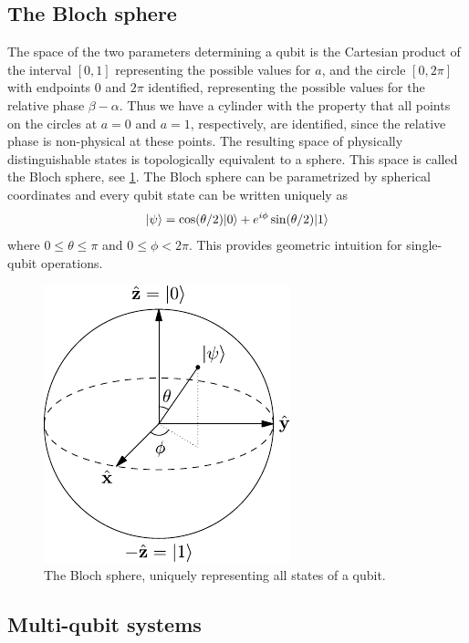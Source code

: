 \documentclass[a4paper,10pt,oneside]{book}
\theoremstyle{plain}
\theoremstyle{definition}
\theoremstyle{remark}
\DeclarePairedDelimiter\ket{\lvert}{\rangle}
\begin{document}
\subsection{The Bloch sphere}

The space of the two parameters determining a qubit is the Cartesian product of the interval $[0,1]$ representing the possible values for $a$, and the circle $[0,2\pi]$ with endpoints $0$ and $2\pi$ identified, representing the possible values for the relative phase $\beta - \alpha$. Thus we have a cylinder with the property that all points on the circles at $a = 0$ and $a = 1$, respectively, are identified, since the relative phase is non-physical at these points. The resulting space of physically distinguishable states is topologically equivalent to a sphere. This space is called the Bloch sphere, see \cref{fig:bloch sphere}. The Bloch sphere can be parametrized by spherical coordinates and every qubit state can be written uniquely as
\begin{equation}
  \ket{\psi} = \cos(\theta/2) \ket{0} + e^{i\phi}\sin(\theta/2) \ket{1}
\end{equation}
where $0 \le \theta \le \pi$ and $0 \le \phi < 2\pi$. This provides geometric intuition for single-qubit operations.

\begin{figure}[!htb]
  \centering
  \includegraphics{img/bloch-sphere.pdf}
  \caption{The Bloch sphere, uniquely representing all states of a qubit.}
  \label{fig:bloch sphere}
\end{figure}



\subsection{Multi-qubit systems}
\end{document}
